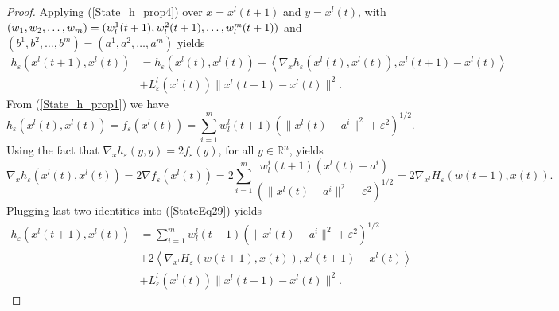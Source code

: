 \documentclass[11pt]{article}
\numberwithin{equation}{section}
\begin{document}
\begin{proof}
Applying (\ref{State_h_prop4}) over $x=x^l(t+1)$ and $y=x^l(t)$, with $(w_1,w_2, \ldots, w_m) = \\(w^1_l(t+1),w^2_l(t+1), \ldots, w^m_l(t+1))$ and $(b^1,b^2, \ldots, b^m)=(a^1,a^2, \ldots, a^m)$ yields
\begin{equation}
\begin{aligned}
	h_{\varepsilon}(x^l(t+1),x^l(t)) &= 
	h_{\varepsilon}(x^l(t),x^l(t)) + \left\langle \nabla_x h_{\varepsilon}(x^l(t),x^l(t)), x^l(t+1)-x^l(t) \right\rangle \\
	&+ L^l_{\varepsilon}(x^l(t))\|x^l(t+1)-x^l(t)\|^2 . \label{StateEq29}
\end{aligned}
\end{equation}
From (\ref{State_h_prop1}) we have
\begin{equation*}
	h_{\varepsilon}(x^l(t),x^l(t)) = f_{\varepsilon}(x^l(t)) = \sum\limits_{i=1}^{m} w^l_l(t+1)\left( \|x^l(t)-a^i\|^2 + {\varepsilon}^2\right)^{1/2} .
\end{equation*}
Using the fact that $\nabla_x h_{\varepsilon}(y,y)=2f_{\varepsilon}(y)$, for all $y \in \mathbb{R}^n$, yields
\begin{equation*}
	\nabla_x h_{\varepsilon}(x^l(t),x^l(t)) = 2\nabla f_{\varepsilon}(x^l(t))= 2\sum\limits_{i=1}^{m}  \frac{w^i_l(t+1)(x^l(t) - a^i)}{\left( \|x^l(t)-a^i\|^2 + {\varepsilon}^2 \right)^{1/2}} = 2\nabla_{x^l} H_{\varepsilon}(w(t+1),x(t)) .
\end{equation*}
Plugging last two identities into (\ref{StateEq29}) yields
\begin{equation}
\begin{aligned} 
	h_{\varepsilon}(x^l(t+1),x^l(t)) &= 
	\sum\limits_{i=1}^{m} w^l_l(t+1)\left( \|x^l(t)-a^i\|^2 + {\varepsilon}^2\right)^{1/2} \\
	&+ 2\left\langle \nabla_{x^l} H_{\varepsilon}(w(t+1),x(t)), x^l(t+1)-x^l(t) \right\rangle \\
	&+ L^l_{\varepsilon}(x^l(t))\|x^l(t+1)-x^l(t)\|^2 . \label{StateEq28}
\end{aligned}
\end{equation}

\end{proof}
\end{document}
